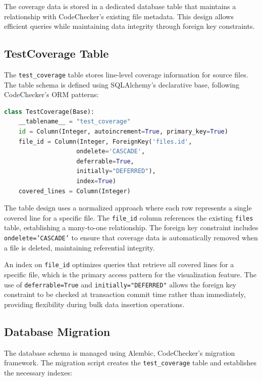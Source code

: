 The coverage data is stored in a dedicated database table that maintains a relationship with CodeChecker's existing file metadata. This design allows efficient queries while maintaining data integrity through foreign key constraints.

\subsection{TestCoverage Table}

The \texttt{test\_coverage} table stores line-level coverage information for source files. The table schema is defined using SQLAlchemy's declarative base, following CodeChecker's ORM patterns:

\begin{lstlisting}[language=Python, caption={TestCoverage database model}]
class TestCoverage(Base):
    __tablename__ = "test_coverage"
    id = Column(Integer, autoincrement=True, primary_key=True)
    file_id = Column(Integer, ForeignKey('files.id', 
                    ondelete='CASCADE', 
                    deferrable=True, 
                    initially="DEFERRED"), 
                    index=True)
    covered_lines = Column(Integer)
\end{lstlisting}

The table design uses a normalized approach where each row represents a single covered line for a specific file. The \texttt{file\_id} column references the existing \texttt{files} table, establishing a many-to-one relationship. The foreign key constraint includes \texttt{ondelete='CASCADE'} to ensure that coverage data is automatically removed when a file is deleted, maintaining referential integrity.

An index on \texttt{file\_id} optimizes queries that retrieve all covered lines for a specific file, which is the primary access pattern for the visualization feature. The use of \texttt{deferrable=True} and \texttt{initially="DEFERRED"} allows the foreign key constraint to be checked at transaction commit time rather than immediately, providing flexibility during bulk data insertion operations.

\subsection{Database Migration}

The database schema is managed using Alembic, CodeChecker's migration framework. The migration script creates the \texttt{test\_coverage} table and establishes the necessary indexes:

